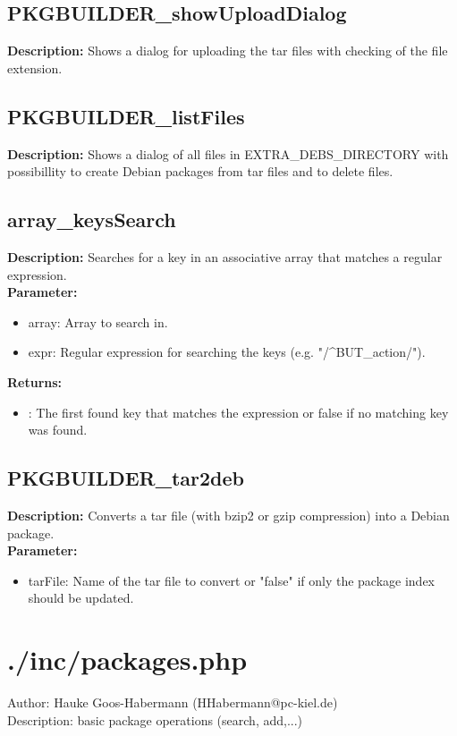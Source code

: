 \subsection{PKGBUILDER\_showUploadDialog}
\textbf{Description:} Shows a dialog for uploading the tar files with checking of the file extension.\\

\subsection{PKGBUILDER\_listFiles}
\textbf{Description:} Shows a dialog of all files in EXTRA\_DEBS\_DIRECTORY with possibillity to create Debian packages from tar files and to delete files.\\

\subsection{array\_keysSearch}
\textbf{Description:} Searches for a key in an associative array that matches a regular expression.\\
\textbf{Parameter:}
\begin{itemize}
\item array: Array to search in.
\item expr: Regular expression for searching the keys (e.g. "/^BUT\_action/").
\end{itemize}
\textbf{Returns:}
\begin{itemize}
\item : The first found key that matches the expression or false if no matching key was found.
\end{itemize}

\subsection{PKGBUILDER\_tar2deb}
\textbf{Description:} Converts a tar file (with bzip2 or gzip compression) into a Debian package.\\
\textbf{Parameter:}
\begin{itemize}
\item tarFile: Name of the tar file to convert or "false" if only the package index should be updated.
\end{itemize}

\newpage\section{./inc/packages.php}
Author: Hauke Goos-Habermann (HHabermann@pc-kiel.de)\\
Description: basic package operations (search, add,...)\\

